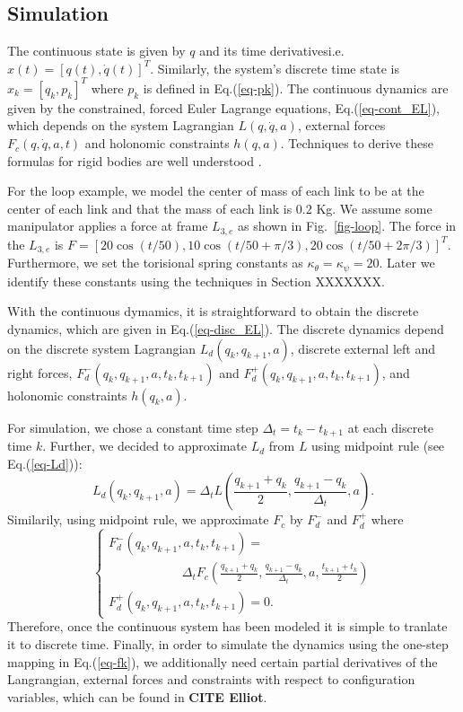 \documentclass[letterpaper, 10pt, conference]{ieeeconf}
\begin{document}
\subsection{Simulation}
The continuous state is given by $q$ and its time derivatives\textemdash i.e. $x(t) = [q(t),\dot{q}(t)]^T$.  Similarly, the system's discrete time state is $x_k = [q_k,p_k]^T$ where $p_k$ is defined in Eq.(\ref{eq-pk}).   The continuous dynamics are given by the constrained, forced Euler Lagrange equations, Eq.(\ref{eq-cont_EL}), which depends on the system Lagrangian $L(q,\dot{q},a)$, external forces $F_c(q,\dot{q},a,t)$ and holonomic constraints $h(q,a)$. Techniques to derive these formulas for rigid bodies are well understood \cite{murray_li_sastry}.  

For the loop example, we model the center of mass of each link to be at the center of each link and that the mass of each link is $0.2$ Kg.  We assume some manipulator applies a force at frame $L_{3,e}$ as shown in Fig.~\ref{fig-loop}.  The force in the $L_{3,e}$ is $F = [20 \cos(t/50), 10 \cos(t/50 + \pi/3), 20 \cos(t/50 + 2\pi/3)]^T$.  Furthermore, we set the torisional spring constants as $\kappa_\theta = \kappa_\psi = 20$.  Later we identify these constants using the techniques in Section XXXXXXX.  

With the continuous dymamics, it is straightforward to obtain the discrete dynamics, which are given in Eq.(\ref{eq-disc_EL}).  The discrete dynamics depend on the discrete system Lagrangian $L_d(q_{k},q_{k+1},a)$, discrete external left and right forces, $F_d^-(q_{k},q_{k+1},a,t_k,t_{k+1})$ and $F_d^+(q_{k},q_{k+1},a,t_k,t_{k+1})$, and holonomic constraints $h(q_k,a)$.  

For simulation, we chose a constant time step $\Delta_t = t_k - t_{k+1}$ at each discrete time $k$.  Further, we decided to approximate $L_d$ from $L$ using midpoint rule (see Eq.(\ref{eq-Ld})):
\begin{equation}
L_d(q_k,q_{k+1},a) = \Delta_t L(\frac{q_{k+1}+q_k}{2},\frac{q_{k+1}-q_k}{\Delta_t},a).
\label{eq-Ld}
\end{equation}
Similarily, using midpoint rule, we approximate $F_c$ by $F_d^-$ and $F_d^+$ where
\begin{equation}
\left\{
\begin{array}{l}
F_d^-(q_k,q_{k+1},a,t_k,t_{k+1}) = \\\hspace{70pt}\Delta_t F_c(\frac{q_{k+1}+q_k}{2},\frac{q_{k+1}-q_k}{\Delta_t},a,\frac{t_{k+1}+t_k}{2})\\
F_d^+(q_k,q_{k+1},a,t_k,t_{k+1}) = 0.
\end{array}
\right.
\label{eq-Fd}
\end{equation}
Therefore, once the continuous system has been modeled it is simple to tranlate it to discrete time.  Finally, in order to simulate the dynamics using the one-step mapping in Eq.(\ref{eq-fk}), we additionally need certain partial derivatives of the Langrangian, external forces and constraints with respect to configuration variables, which can be found in \textbf{CITE Elliot}.  
\end{document}
